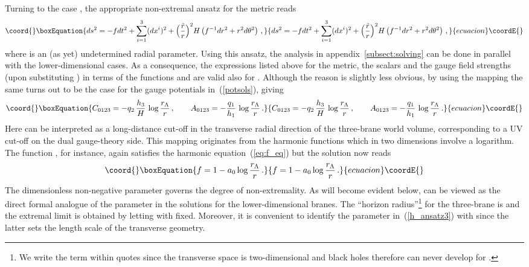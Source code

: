 \documentclass[a4paper,11pt]{article}
\providecommand{\eqref}[1]{(\ref{#1})}
\begin{document}
Turning to the case \coordHE{}, the appropriate non-extremal ansatz for the
metric reads~\cite{Lu:1997kg}
\begin{equation}\coord{}\boxEquation{
\label{h_ansatz3}
ds^2 = - f dt^2 + \sum_{i=1}^3 (dx^i)^2 +
 \Big(\frac{\tilde{r}}{r}\Big)^2 H \left( f^{-1}dr^2 + r^2 d\theta^2
 \right) \,,
}{
ds^2 = - f dt^2 + \sum_{i=1}^3 (dx^i)^2 +
 \Big(\frac{\tilde{r}}{r}\Big)^2 H \left( f^{-1}dr^2 + r^2 d\theta^2
 \right) \,,
}{ecuacion}\coordE{}\end{equation}
where \coordHE{} is an (as yet) undetermined radial parameter. Using
this ansatz, the analysis in appendix~\ref{subsect:solving} can be
done in parallel with the lower-dimensional cases. As a consequence,
the expressions listed above for the metric, the scalars and the gauge
field strengths (upon substituting \coordHE{}) in terms of the
functions \coordHE{} and \coordHE{} are valid also for \coordHE{}. Although the
reason is slightly less obvious, by using the mapping
\coordHE{} the same turns out to be the
case for the gauge potentials in~\eqref{potsols}, giving
\begin{equation}\coord{}\boxEquation{
\label{potentials3}
C_{0123} = - q_2\,\frac{h_3}{H}\,\log\frac{r_\Lambda}{r} \spa
A_{0123} = - \frac{q_1}{h_1}\,\log\frac{r_\Lambda}{r} \,.
}{
C_{0123} = - q_2\,\frac{h_3}{H}\,\log\frac{r_\Lambda}{r} \spa
A_{0123} = - \frac{q_1}{h_1}\,\log\frac{r_\Lambda}{r} \,.
}{ecuacion}\coordE{}\end{equation}
Here \coordHE{} can be interpreted as a long-distance cut-off in the
transverse radial direction of the three-brane world volume,
corresponding to a UV cut-off on the dual gauge-theory side. This
mapping originates from the harmonic functions which in two dimensions
involve a logarithm. The function \coordHE{}, for instance, again satisfies
the harmonic equation~\eqref{eq:f_eq} but the solution now reads
\begin{equation}\coord{}\boxEquation{
\label{fresult3}
f= 1 - a_0 \log\frac{r_\Lambda}{r} \,.
}{
f= 1 - a_0 \log\frac{r_\Lambda}{r} \,.
}{ecuacion}\coordE{}\end{equation}
The dimensionless non-negative parameter \coordHE{} governs the degree of
non-extremality. As will become evident below, \coordHE{} can be viewed as
the direct formal analogue of the parameter \coordHE{} in the solutions for
the lower-dimensional branes. The ``horizon radius''\footnote{We write
the term within quotes since the transverse space is two-dimensional
and black holes therefore can never develop for \coordHE{}.} for the
three-brane is \coordHE{} and the extremal limit is
obtained by letting \coordHE{} with \coordHE{}
fixed. Moreover, it is convenient to identify the parameter
\coordHE{} in~\eqref{h_ansatz3} with \coordHE{} since the latter
sets the length scale of the transverse geometry.
\end{document}
